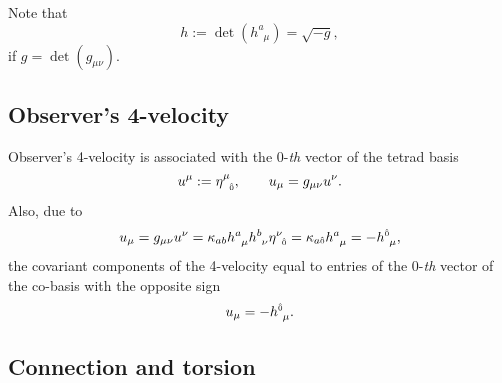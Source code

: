 \documentclass[
10pt, %
a4paper, %
oneside, %
twocolumn,
headinclude,footinclude, %
BCOR5mm, %
]{scrartcl}
\newcommand{\mg}[1]{\kappa_{#1}}			%
\newcommand{\tetrsymbol}{h}
\newcommand{\itetrsymbol}{\eta}
\newcommand{\itetr}[2]{\itetrsymbol^{#1}_{\phantom{#1}#2}}
\newcommand{\tetr}[2]{\tetrsymbol^{#1}_{\phantom{#1}#2}}
\newcommand{\detTetr}{\tetrsymbol}
\newcommand{\KD}[2]{\delta^{#1}_{\ #2}}
\newcommand{\indalg}[1]{\hat{\mathsmaller{#1}}}
\newcommand{\ho}[1]{\textcolor{magenta}{HO: #1}}
\begin{document}
	
	Note that 
	\begin{equation}\label{eqn.det}
		\detTetr := \det(\tetr{a}{\mu}) = \sqrt{-g},
	\end{equation}
	if $ g = \det(g_{\mu\nu}) $.
	
	\subsection{Observer's 4-velocity}
	
	Observer's 4-velocity is associated with the $ 0 $-\textit{th} vector of the tetrad basis 
	\begin{equation}\label{eqn.4v}
		u^\mu := \itetr{\mu}{\indalg{0}}, \qquad u_\mu = g_{\mu\nu}u^\nu.
	\end{equation}
	Also, due to
	\begin{equation}
		u_\mu = g_{\mu\nu} u^\nu = \mg{ab}\tetr{a}{\mu}\tetr{b}{\nu}\itetr{\nu}{\indalg{0}} = 
		\mg{a\indalg{0}}\tetr{a}{\mu} = -\tetr{\indalg{0}}{\mu},
	\end{equation}\label{eqn.4v.cov}
	the covariant components of the 4-velocity equal to entries of the $ 0 $-\textit{th} vector of 
	the 
	co-basis with the opposite sign
	\begin{equation}
		u_\mu = -\tetr{\indalg{0}}{\mu}.
	\end{equation}
	
	
	
	
	\subsection{Connection and torsion}
	
\end{document}
